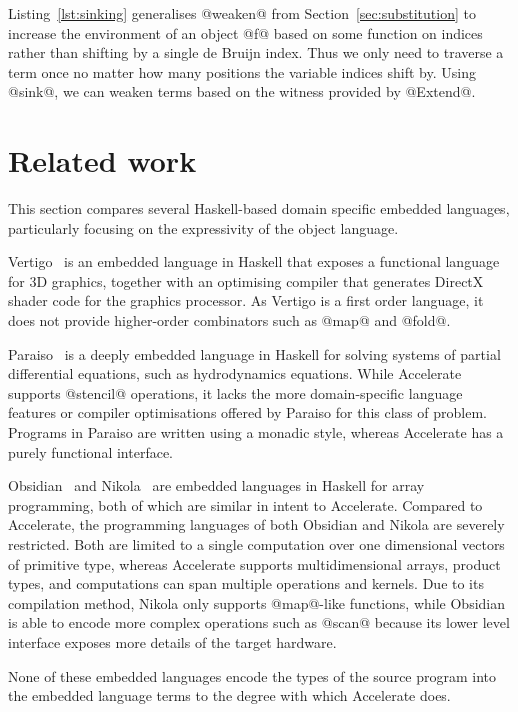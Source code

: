 Listing~\ref{lst:sinking} generalises @weaken@ from
Section~\ref{sec:substitution} to increase the environment of an object @f@
based on some function on indices rather than shifting by a single de Bruijn
index. Thus we only need to traverse a term once no matter how many positions
the variable indices shift by. Using @sink@, we can weaken terms based on the
witness provided by @Extend@.


\section{Related work}

This section compares several Haskell-based domain specific embedded languages,
particularly focusing on the expressivity of the object language.
\lang[embedded]{}\lang[object]{}

Vertigo~\cite{Elliott:2004hh} is an embedded language in Haskell that exposes a
functional language for 3D graphics, together with an optimising compiler that
generates DirectX shader code for the graphics processor. As Vertigo is a first
order language, it does not provide higher-order combinators such as @map@ and
@fold@.

Paraiso~\cite{Muranushi:2012eh} is a deeply embedded language in Haskell for
solving systems of partial differential equations, such as hydrodynamics
equations. While Accelerate supports @stencil@ operations,
it lacks the more domain-specific language features or compiler optimisations
offered by Paraiso for this class of problem. Programs in Paraiso are written
using a monadic style, whereas Accelerate has a purely functional interface.

Obsidian~\cite{Svensson:2008a} and Nikola~\cite{Mainland:2010vj} are embedded
languages in Haskell for array programming, both of which are similar in intent
to Accelerate. Compared to Accelerate, the programming languages of both
Obsidian and Nikola are severely restricted. Both are limited to a single
computation over one dimensional vectors of primitive type, whereas Accelerate
supports multidimensional arrays, product types, and computations can span
multiple operations and kernels. Due to its compilation method, Nikola only
supports @map@-like functions, while Obsidian is able to encode more complex
operations such as @scan@ because its lower level interface exposes more details
of the target hardware.

None of these embedded languages encode the types of the source program into the
embedded language terms to the degree with which Accelerate does.

